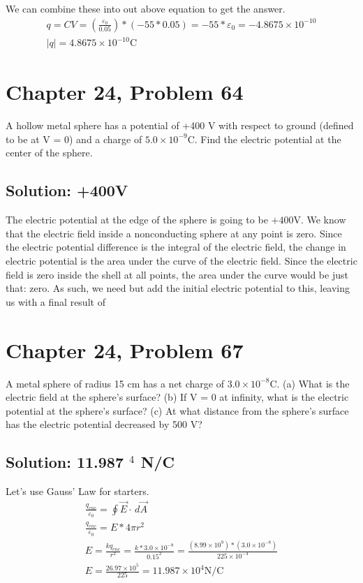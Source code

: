 \documentclass[12pt]{article}
\begin{document}
We can combine these into out above equation to get the answer.
\begin{gather*}
    q   =   CV
        =   (\frac{\varepsilon_0}{0.05}) * (-55 * 0.05)
        =   -55 * \varepsilon_0
        =   -4.8675 \times 10^{-10}\\
    |q| =   \boxed{4.8675 \times 10^{-10} \unit{\coulomb}}
\end{gather*}

\pagebreak
\section{Chapter 24, Problem 64}
A hollow metal sphere has a potential of +400 V with respect to ground (defined to be at V = 0) and a charge of $5.0 \times 10^{-9} \unit{\coulomb}$. Find the electric potential at the center of the sphere.

\subsection*{Solution: +400V}
The electric potential at the edge of the sphere is going to be $+400 \unit{\volt}$.
We know that the electric field inside a nonconducting sphere at any point is zero. 
Since the electric potential difference is the integral of the electric field, the change in electric potential is the area under the curve of the electric field.
Since the electric field is zero inside the shell at all points, the area under the curve would be just that: zero.
As such, we need but add the initial electric potential to this, leaving us with a final result of \boxed{+400 \unit{\volt}}

\pagebreak
\section{Chapter 24, Problem 67}
A metal sphere of radius 15 cm has a net charge of $3.0 \times 10^{-8} \unit{\coulomb}$. (a) What is the electric field at the sphere's surface? (b) If V = 0 at infinity, what is the electric potential at the sphere's surface? (c) At what distance from the sphere's surface has the electric potential decreased by 500 V?

\subsection{Solution: 11.987 $^4$ N/C}
Let's use Gauss' Law for starters. 
\begin{gather*}
    \frac{q_{enc}}{\varepsilon_0} = \oint \vec{E} \cdot\,d\vec{A}\\
    \frac{q_{enc}}{\varepsilon_0} = E * 4\pi r^2\\
    E   =   \frac{kq_{enc}}{r^2}
        =   \frac{k*3.0 \times 10^{-8}}{0.15^2}
        =   \frac{(8.99 \times 10^9) * (3.0 \times 10^{-8})}{225 \times 10^{-4}}\\
    E   =   \frac{26.97 \times 10^{5}}{225}
        =   \boxed{11.987 \times 10^4 \unit{\newton/\coulomb}}
\end{gather*}
\end{document}
